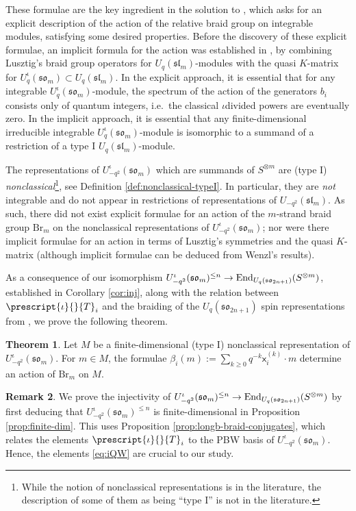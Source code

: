 \documentclass[10pt]{amsart}
\numberwithin{equation}{section}
\theoremstyle{definition}
\newtheorem{thm}{Theorem}[section]
\newtheorem{rem}[thm]{Remark}
\newcommand{\End}{{\rm End}}
\newcommand{\slm}{\mathfrak{sl}_{m}}
\newcommand{\son}[1][2n+1]{\mathfrak{so}_{#1}}
\newcommand{\som}[1][m]{\mathfrak{so}_{#1}}
\newcommand{\Br}{\mathrm{Br}}
\newcommand{\iqUsom}[1][m]{{U}^{\iota}_{-q^2}(\som[#1])}
\newcommand{\iQW}{\prescript{\iota}{}{T}}
\newcommand{\xxb}{\mathsf{x}}
\begin{document}
These formulae are the key ingredient in the solution to \cite[Problem 1.1]{wang2026relativebraidgroupsymmetries}, 
which asks for an explicit description of the action of the relative braid group on integrable modules, satisfying some desired properties. 
Before the discovery of these explicit formulae, an implicit formula for the action was established in \cite{WangZhangintrinsic}, 
by combining Lusztig's braid group operators for $U_{q}(\slm)$-modules with the quasi $K$-matrix for $U_q^{\iota}(\som)\subset U_{q}(\slm)$. 
In the explicit approach, 
it is essential that for any integrable $U_q^{\iota}(\som)$-module, 
the spectrum of the action of the generators $b_i$ consists only of quantum integers, 
i.e.~the classical $\iota$divided powers are eventually zero.
In the implicit approach, 
it is essential that any finite-dimensional irreducible integrable $U_q^{\iota}(\som)$-module 
is isomorphic to a summand of a restriction of a type I $U_{q}(\slm)$-module. 

The representations of $\iqUsom$ which are summands of $S^{\otimes m}$ 
are (type I) \emph{nonclassical}\footnote{While the notion of nonclassical representations is in the literature, 
the description of some of them as being ``type I'' is not in the literature.}, see Definition \ref{def:nonclassical-typeI}.
In particular, they are \emph{not} integrable and do not appear in restrictions of representations of $U_{-q^2}(\slm)$.
As such, there did not exist explicit formulae for an action of the $m$-strand braid group $\Br_m$ on the 
nonclassical representations of $\iqUsom$; 
nor were there implicit formulae for an action in terms of Lusztig's symmetries and the quasi $K$-matrix 
(although implicit formulae can be deduced from Wenzl's results). 

As a consequence of our isomorphism $\iqUsom^{\le n}\rightarrow \End_{U_q(\son)}(S^{\otimes m})$,
established in Corollary \ref{cor:inj}, 
along with the relation between $\iQW_i$ and the braiding of the $U_{q}(\son)$ spin representations
from \cite[Theorem 1.26]{BER}, we prove the following theorem. 

\begin{thm}\label{thm:mainthm2}
Let $M$ be a finite-dimensional (type I) nonclassical representation of $\iqUsom$. 
For $m \in M$, the formulae $\beta_i(m):=\sum_{k \ge 0} q^{-k}\xxb^{(k)}_i\cdot m$
determine an action of $\Br_m$ on $M$.
\end{thm}

\begin{rem}
We prove the injectivity of $\iqUsom^{\le n}\rightarrow \End_{U_q(\son)}(S^{\otimes m})$ 
by first deducing that $\iqUsom^{\le n}$ is finite-dimensional 
in Proposition \ref{prop:finite-dim}.
This uses Proposition \ref{prop:longb-braid-conjugates}, which relates
the elements $\iQW_i$ to the PBW basis of $\iqUsom$.
Hence, the elements \eqref{eq:iQW} are crucial to our study.
\end{rem}
\end{document}
